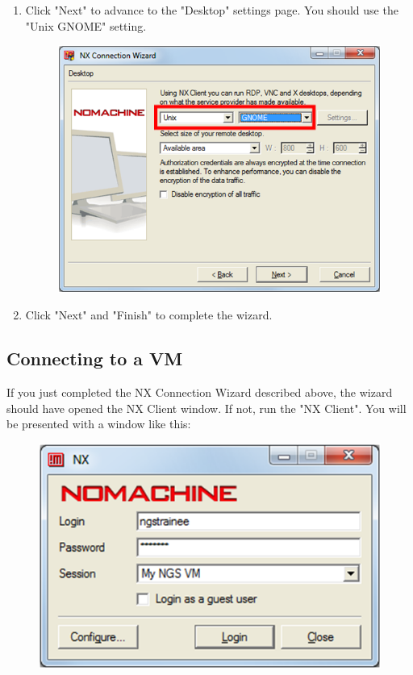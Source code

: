 \begin{enumerate}
\begin{description}
\begin{figure}[H]
    \caption{\label{fig:nx_session_configuration}}
  \end{figure}
  \end{description}
  \item Click "Next" to advance to the "Desktop" settings page. You should use the
  "Unix GNOME" setting.
  \begin{figure}[H]
    \centering
    \includegraphics[scale=0.5]{nx_client/desktop_type.png}
    \caption{\label{fig:nx_desktop_type}}
  \end{figure}
  \item Click "Next" and "Finish" to complete the wizard.
\end{enumerate}

\subsection{Connecting to a VM}
If you just completed the NX Connection Wizard described above, the wizard
should have opened the NX Client window. If not, run the "NX Client". You will
be presented with a window like this:
\begin{figure}[H]
  \centering
  \includegraphics[scale=0.5]{nx_client/login.png}
  \caption{\label{fig:nx_login}}
\end{figure}

